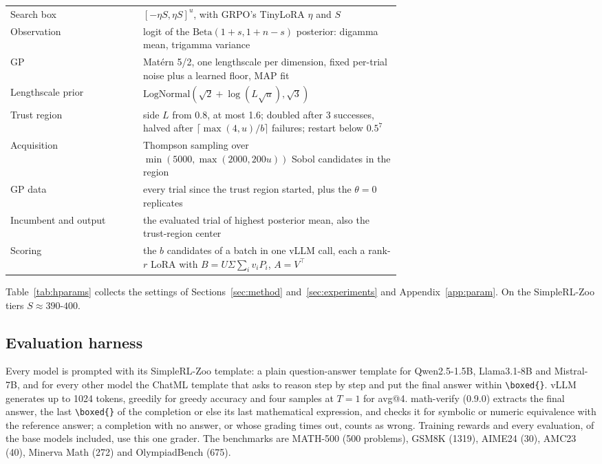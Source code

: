 \documentclass[twoside]{article}
\begin{document}
\begin{table}[!htbp]
\begin{tabular}{@{}lp{0.66\linewidth}@{}}
Search box & $[-\eta S, \eta S]^u$, with GRPO's TinyLoRA $\eta$ and $S$ \\
Observation & logit of the $\mathrm{Beta}(1 + s, 1 + n - s)$ posterior: digamma mean, trigamma variance \\
GP & Mat\'ern 5/2, one lengthscale per dimension, fixed per-trial noise plus a learned floor, MAP fit \\
Lengthscale prior & $\mathrm{LogNormal}(\sqrt{2} + \log(L\sqrt{u}), \sqrt{3})$ \\
Trust region & side $L$ from 0.8, at most 1.6; doubled after 3 successes, halved after $\lceil \max(4, u)/b \rceil$ failures; restart below $0.5^7$ \\
Acquisition & Thompson sampling over $\min(5000, \max(2000, 200u))$ Sobol candidates in the region \\
GP data & every trial since the trust region started, plus the $\theta = 0$ replicates \\
Incumbent and output & the evaluated trial of highest posterior mean, also the trust-region center \\
Scoring & the $b$ candidates of a batch in one vLLM call, each a rank-$r$ LoRA with $B = U\Sigma\sum_i v_i P_i$, $A = V^\top$ \\
\bottomrule
\end{tabular}
\end{table}

Table~\ref{tab:hparams} collects the settings of Sections~\ref{sec:method} and~\ref{sec:experiments} and Appendix~\ref{app:param}. On the SimpleRL-Zoo tiers $S \approx 390$-$400$.

\subsection{Evaluation harness}
\label{app:harness}

Every model is prompted with its SimpleRL-Zoo template: a plain question-answer template for Qwen2.5-1.5B, Llama3.1-8B and Mistral-7B, and for every other model the ChatML template that asks to reason step by step and put the final answer within \verb|\boxed{}|. vLLM \citep{kwon2023vllm} generates up to 1024 tokens, greedily for greedy accuracy and four samples at $T = 1$ for avg@4. math-verify (0.9.0) extracts the final answer, the last \verb|\boxed{}| of the completion or else its last mathematical expression, and checks it for symbolic or numeric equivalence with the reference answer; a completion with no answer, or whose grading times out, counts as wrong. Training rewards and every evaluation, of the base models included, use this one grader. The benchmarks are MATH-500 (500 problems), GSM8K (1319), AIME24 (30), AMC23 (40), Minerva Math (272) and OlympiadBench (675).
\end{document}
